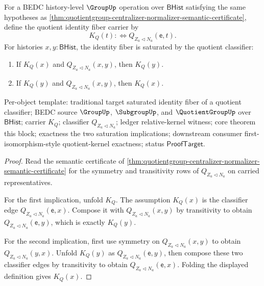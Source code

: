 \begin{theorem}
\label{thm:quotientgroup-centralizer-normalizer-identity-fiber-classifier-saturation}
For a BEDC history-level $\GroupUp$ operation over $\mathsf{BHist}$ satisfying
the same hypotheses as
\autoref{thm:quotientgroup-centralizer-normalizer-semantic-certificate}, define
the quotient identity fiber carrier by
$$
K_Q(t) :\Longleftrightarrow Q_{Z_a\triangleleft N_a}(\mathsf{e},t).
$$
For histories $x,y:\mathsf{BHist}$, the identity fiber is saturated by the
quotient classifier:
\begin{enumerate}
\item If $K_Q(x)$ and $Q_{Z_a\triangleleft N_a}(x,y)$, then $K_Q(y)$.
\item If $K_Q(y)$ and $Q_{Z_a\triangleleft N_a}(x,y)$, then $K_Q(x)$.
\end{enumerate}
Per-object template: traditional target saturated identity fiber of a quotient
classifier; BEDC source $\GroupUp$, $\SubgroupUp$, and $\QuotientGroupUp$ over
$\mathsf{BHist}$; carrier $K_Q$; classifier $Q_{Z_a\triangleleft N_a}$; ledger
relative-kernel witness; core theorem this block; exactness the two saturation
implications; downstream consumer first-isomorphism-style quotient-kernel
exactness; status $\mathsf{ProofTarget}$.
\end{theorem}
\begin{proof}
Read the semantic certificate of
\autoref{thm:quotientgroup-centralizer-normalizer-semantic-certificate} for the
symmetry and transitivity rows of $Q_{Z_a\triangleleft N_a}$ on carried
representatives.

For the first implication, unfold $K_Q$. The assumption $K_Q(x)$ is the
classifier edge $Q_{Z_a\triangleleft N_a}(\mathsf{e},x)$. Compose it with
$Q_{Z_a\triangleleft N_a}(x,y)$ by transitivity to obtain
$Q_{Z_a\triangleleft N_a}(\mathsf{e},y)$, which is exactly $K_Q(y)$.

For the second implication, first use symmetry on
$Q_{Z_a\triangleleft N_a}(x,y)$ to obtain
$Q_{Z_a\triangleleft N_a}(y,x)$. Unfold $K_Q(y)$ as
$Q_{Z_a\triangleleft N_a}(\mathsf{e},y)$, then compose these two classifier
edges by transitivity to obtain $Q_{Z_a\triangleleft N_a}(\mathsf{e},x)$.
Folding the displayed definition gives $K_Q(x)$.
\end{proof}


